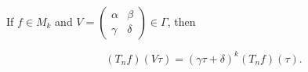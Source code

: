 If $f \in M_k$ and $V = \begin{pmatrix} \alpha & \beta \\ \gamma & \delta \end{pmatrix} \in \Gamma$, then

$$(T_n f)(V \tau) = (\gamma \tau + \delta)^k (T_n f)(\tau).$$
